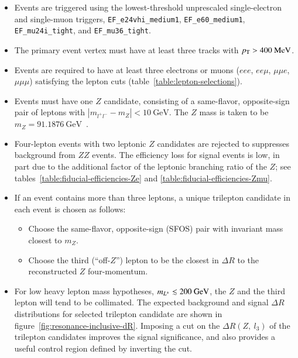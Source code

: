 \begin{itemize}
	\item Events are triggered using the lowest-threshold unprescaled single-electron and single-muon triggers, \texttt{EF\_e24vhi\_medium1}, \texttt{EF\_e60\_medium1}, \texttt{EF\_mu24i\_tight}, and \texttt{EF\_mu36\_tight}.
	\item The primary event vertex must have at least three tracks with $p_{\text{T}}>400~\mbox{MeV}$.
	\item Events are required to have at least three electrons or muons ($eee$, $ee\mu$, $\mu\mu e$, $\mu\mu\mu$) satisfying the lepton cuts (table~\ref{table:lepton-selections}). 
	\item Events must have one $Z$ candidate, consisting of a same-flavor, opposite-sign pair of leptons with $|m_{l^+l^-}-m_{Z}|<10~\mbox{GeV}$. The $Z$ mass is taken to be $m_Z=91.1876~\mbox{GeV}$~\cite{PhysRevD.86.010001}. 
	\item Four-lepton events with two leptonic $Z$ candidates are rejected to suppresses background from $ZZ$ events. The efficiency loss for signal events is low, in part due to the additional factor of the leptonic branching ratio of the $Z$; see tables~\ref{table:fiducial-efficiencies-Ze} and \ref{table:fiducial-efficiencies-Zmu}. 
	\item If an event contains more than three leptons, a unique trilepton candidate in each event is chosen as follows:
	\begin{itemize}
		\item Choose the same-flavor, opposite-sign (SFOS) pair with invariant mass closest to $m_{Z}$.
		\item Choose the third (``off-$Z$'') lepton to be the closest in $\Delta R$ to the reconstructed $Z$ four-momentum.
	\end{itemize}
	\item For low heavy lepton mass hypotheses, $m_{L^{\pm}}\lesssim 200~\mbox{GeV}$, the $Z$ and the third lepton will tend to be collimated. The expected background and signal $\Delta R$ distributions for selected trilepton candidate are shown in figure~\ref{fig:resonance-inclusive-dR}. Imposing a cut on the $\Delta R(Z,\ l_3)$ of the trilepton candidates improves the signal significance, and also provides a useful control region defined by inverting the cut.


\end{itemize}
